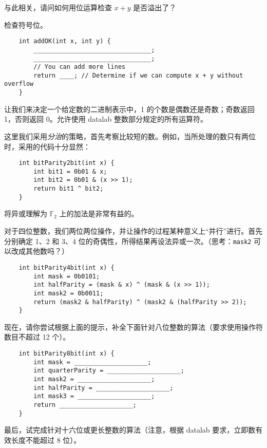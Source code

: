 \begin{example}[模拟操作 1]
        与此相关，请问如何用位运算检查 $x+y$ 是否溢出了？\begin{hint} 检查符号位。 \end{hint}
        \begin{verbatim}
    int addOK(int x, int y) {
        ________________________________;
        ________________________________;
        // You can add more lines
        return ____; // Determine if we can compute x + y without overflow
    }
        \end{verbatim}
    \end{example}

    \begin{example}[计数]
        让我们来决定一个给定数的二进制表示中，1 的个数是偶数还是奇数；奇数返回 1，否则返回 0。允许使用 datalab 整数部分规定的所有运算符。
        
        这里我们采用\emph{分治}的策略，首先考察比较短的数。例如，当所处理的数只有两位时，采用的代码十分显然：
        \begin{verbatim}
    int bitParity2bit(int x) {
        int bit1 = 0b01 & x;
        int bit2 = 0b01 & (x >> 1);
        return bit1 ^ bit2;
    }
        \end{verbatim}
        将异或理解为 $\mathbb F_2$ 上的加法是非常有益的。

        对于四位整数，我们两位两位操作，并让操作的过程某种意义上“并行”进行。首先分别确定 1、2 和 3、4 位的奇偶性，所得结果再设法异或一次。（思考：\texttt{mask2} 可以改成其他数吗？）
        \begin{verbatim}
    int bitParity4bit(int x) {
        int mask = 0b0101;
        int halfParity = (mask & x) ^ (mask & (x >> 1));
        int mask2 = 0b0011;
        return (mask2 & halfParity) ^ (mask2 & (halfParity >> 2));
    }
        \end{verbatim}

        现在，请你尝试根据上面的提示，补全下面针对八位整数的算法（要求使用操作符数目不超过 12 个）。
        \begin{verbatim}
    int bitParity8bit(int x) {
        int mask = ____________________;
        int quarterParity = ____________________;
        int mask2 = ____________________;
        int halfParity = ____________________;
        int mask3 = ____________________;
        return ____________________;
    }
        \end{verbatim}
        最后，试完成针对十六位或更长整数的算法（注意，根据 datalab 要求，立即数有效长度不能超过 8 位）。
        

\end{example}
